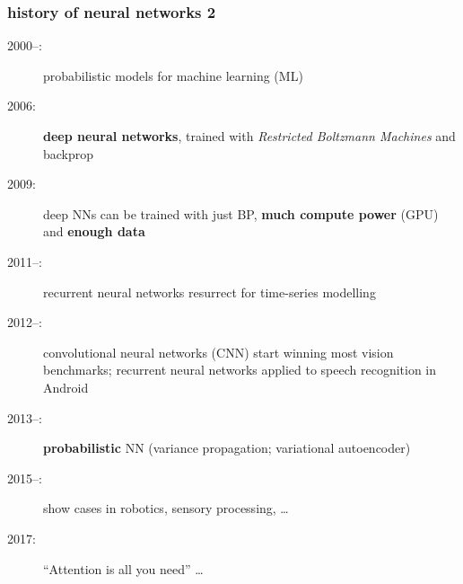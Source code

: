 \documentclass[USenglish,pdftex,compress,10pt,svgnamesi]{beamer}%
\begin{document}



\begin{frame}
\frametitle{history of neural networks 2}

\begin{description}
\item[2000--:] probabilistic models for machine learning (ML)

\item[2006:] \textbf{deep neural networks}, trained with \textsl{Restricted Boltzmann Machines} and backprop

\item[2009:] deep NNs can be trained with just BP,  \textbf{much compute power} (GPU) and \textbf{enough data}

\item[2011--:] recurrent neural networks resurrect for time-series modelling

\item[2012--:] convolutional neural networks (CNN) start winning most vision benchmarks; recurrent neural networks applied to speech recognition in Android

\item[2013--:] \textbf{probabilistic} NN (variance propagation; variational autoencoder)

\item[2015--:] show cases in robotics, sensory processing, \dots

\item[2017:] ``Attention is all you need'' \dots
\end{description}
\end{frame}
\end{document}
